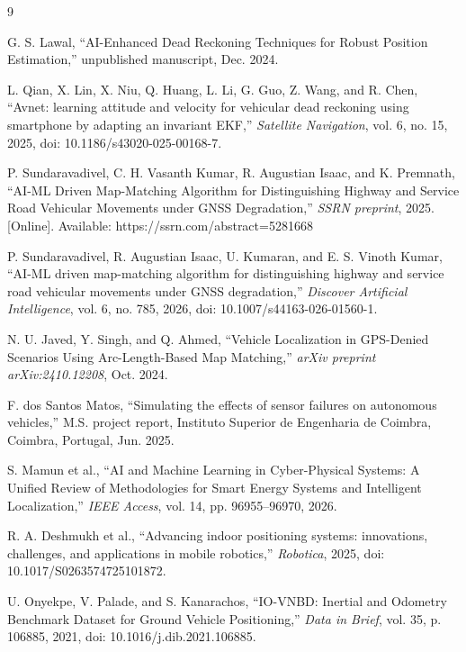 \documentclass[conference]{IEEEtran}
\begin{document}
\begin{thebibliography}{9}

 G. S. Lawal, ``AI-Enhanced Dead Reckoning Techniques for Robust Position Estimation,'' unpublished manuscript, Dec. 2024.

 L. Qian, X. Lin, X. Niu, Q. Huang, L. Li, G. Guo, Z. Wang, and R. Chen, ``Avnet: learning attitude and velocity for vehicular dead reckoning using smartphone by adapting an invariant EKF,'' \emph{Satellite Navigation}, vol. 6, no. 15, 2025, doi: 10.1186/s43020-025-00168-7.

 P. Sundaravadivel, C. H. Vasanth Kumar, R. Augustian Isaac, and K. Premnath, ``AI-ML Driven Map-Matching Algorithm for Distinguishing Highway and Service Road Vehicular Movements under GNSS Degradation,'' \emph{SSRN preprint}, 2025. [Online]. Available: https://ssrn.com/abstract=5281668

 P. Sundaravadivel, R. Augustian Isaac, U. Kumaran, and E. S. Vinoth Kumar, ``AI-ML driven map-matching algorithm for distinguishing highway and service road vehicular movements under GNSS degradation,'' \emph{Discover Artificial Intelligence}, vol. 6, no. 785, 2026, doi: 10.1007/s44163-026-01560-1.

 N. U. Javed, Y. Singh, and Q. Ahmed, ``Vehicle Localization in GPS-Denied Scenarios Using Arc-Length-Based Map Matching,'' \emph{arXiv preprint arXiv:2410.12208}, Oct. 2024.

 F. dos Santos Matos, ``Simulating the effects of sensor failures on autonomous vehicles,'' M.S. project report, Instituto Superior de Engenharia de Coimbra, Coimbra, Portugal, Jun. 2025.

 S. Mamun et al., ``AI and Machine Learning in Cyber-Physical Systems: A Unified Review of Methodologies for Smart Energy Systems and Intelligent Localization,'' \emph{IEEE Access}, vol. 14, pp. 96955--96970, 2026.

 R. A. Deshmukh et al., ``Advancing indoor positioning systems: innovations, challenges, and applications in mobile robotics,'' \emph{Robotica}, 2025, doi: 10.1017/S0263574725101872.

 U. Onyekpe, V. Palade, and S. Kanarachos, ``IO-VNBD: Inertial and Odometry Benchmark Dataset for Ground Vehicle Positioning,'' \emph{Data in Brief}, vol. 35, p. 106885, 2021, doi: 10.1016/j.dib.2021.106885.

\end{thebibliography}
\end{document}
